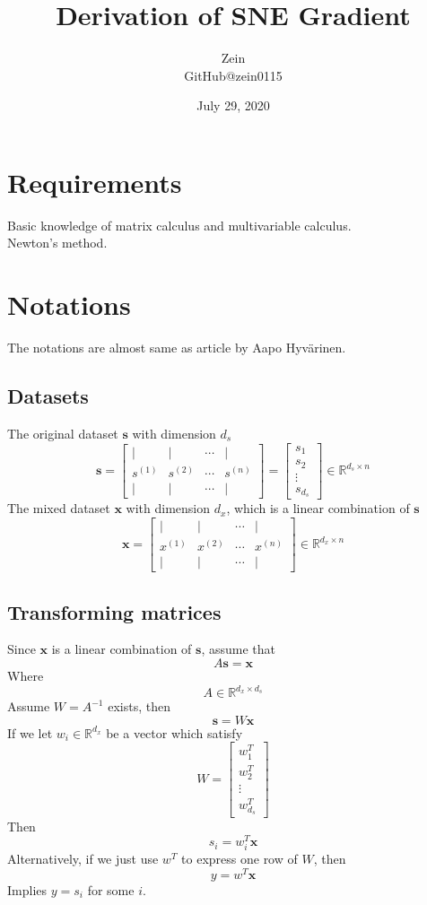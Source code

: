 \documentclass[11pt]{article}
\title{Derivation of SNE Gradient}
\author{Zein\\GitHub@zein0115}
\date{July 29, 2020}
\begin{document}
\maketitle

\section{Requirements}
Basic knowledge of matrix calculus and multivariable calculus.\\
Newton's method.

\section{Notations}
The notations are almost same as article by Aapo Hyvärinen.
\subsection{Datasets}
The original dataset $\mathbf{s}$ with dimension $d_s$
$$
\mathbf{s} = 
\left[
    \begin{matrix}
        | & | &  \cdots & | \\
        s^{(1)} & s^{(2)} &  \cdots & s^{(n)}\\
        | & | &  \cdots & |
    \end{matrix}
\right] = 
\left[
    \begin{matrix}
        s_1\\s_2\\\vdots\\s_{d_s}
    \end{matrix}
\right]
\in \mathbb{R}^{d_s\times n}
$$
The mixed dataset $\mathbf{x}$ with dimension $d_x$, which is a linear combination of $\mathbf{s}$
$$
\mathbf{x} = 
\left[
    \begin{matrix}
        | & | &  \cdots & | \\
        x^{(1)} & x^{(2)} &  \cdots & x^{(n)}\\
        | & | &  \cdots & |
    \end{matrix}
\right]
\in \mathbb{R}^{d_x\times n}
$$
\subsection{Transforming matrices}
Since $\mathbf{x}$ is a linear combination of $\mathbf{s}$, assume that 
$$
A\mathbf{s} = \mathbf{x}
$$
Where
$$
    A\in\mathbb{R}^{d_x\times d_s}
$$
Assume $W = A^{-1}$ exists, then
$$
\mathbf{s} = W\mathbf{x}
$$
If we let $w_i\in\mathbb{R}^{d_x}$ be a vector which satisfy
$$
W = \left[
    \begin{matrix}
        w_1^T\\w_2^T\\\vdots\\w_{d_s}^T
    \end{matrix}
\right]
$$
Then
$$
s_i = w_i^T\mathbf{x}
$$
Alternatively, if we just use $w^T$ to express one row of $W$, then
$$
y = w^T\mathbf{x}
$$
Implies $y=s_i$ for some $i$.
\end{document}
